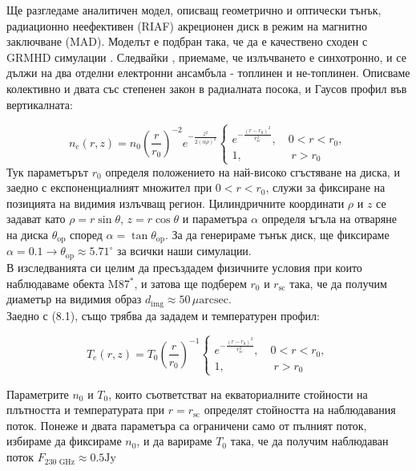 \documentclass[12pt]{article}
\numberwithin{equation}{section}
\numberwithin{figure}{section}
\begin{document}
	Ще разгледаме аналитичен модел, описващ геометрично и оптически тънък, радиационно неефективен (RIAF) акреционен диск в режим на магнитно заключване (MAD). Моделът е подбран така, че да е качествено сходен с GRMHD симулации \cite{Yuan2003}. Следвайки \cite{Broderick2021}, \cite{Gold2020} приемаме, че излъчването е синхотронно, и се дължи на два отделни електронни ансамбъла - топлинен и не-топлинен. Описваме колективно и двата със степенен закон в радиалната посока, и Гаусов профил във вертикалната:
	
	\begin{equation}
		n_e(r,z) = n_0\left(\frac{r}{r_0}\right)^{-2}e^{-\frac{z^2}{2(\alpha\rho)^2}}
		\begin{cases}
			e^{-\frac{(r-r_0)^2}{r^2_{\text{sc}}}},\quad 0 < r < r_0,\\
			1,\,\,\qquad\qquad r>r_0
		\end{cases}
	\end{equation}
	Тук параметърът $r_0$ определя положението на най-високо сгъстяване на диска, и заедно с експоненциалният множител при $0 < r < r_0$, служи за фиксиране на позицията на видимия излъчващ регион. Цилиндричните координати $\rho$ и $z$ се задават като $\rho = r\sin\theta$, $z = r\cos\theta$ и параметъра $\alpha$ определя ъгъла на отваряне на диска $\theta_{\text{op}}$ според $\alpha = \tan\theta_\text{op}$. За да генерираме тънък диск, ще фиксираме $\alpha = 0.1 \rightarrow \theta_{\text{op}}\approx 5.71^\circ$ за всички наши симулации.\\
	В изследванията си целим да пресъздадем физичните условия при които наблюдаваме обекта M87$^*$, и затова ще подберем $r_0$ и $r_\text{sc}$ така, че да получим диаметър на видимия образ $d_\text{img}\approx 50\, \mu\text{arcsec}$.\\
	
	Заедно с (8.1), също трябва да зададем и температурен профил:
	
	\begin{equation}
		T_e(r,z) = T_0\left(\frac{r}{r_0}\right)^{-1}
		\begin{cases}
			e^{-\frac{(r-r_0)^2}{r^2_{\text{sc}}}},\quad 0 < r < r_0,\\
			1,\,\,\qquad\qquad r>r_0
		\end{cases}
	\end{equation}
	
	Параметрите $n_0$ и $T_0$, които съответстват на екваториалните стойности на плътността и температурата при $r = r_\text{sc}$ определят стойността на наблюдавания поток. Понеже и двата параметъра са ограничени само от пълният поток, избираме да фиксираме $n_0$, и да варираме $T_0$ така, че да получим наблюдаван поток $F_{\text{230 GHz}} \approx 0.5 \text{Jy}$\\
	
\end{document}
